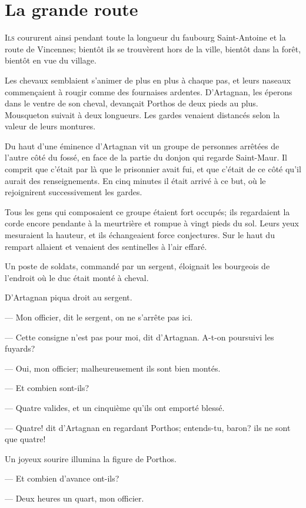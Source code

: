 \chapter{La grande route}

\lettrine{I}{ls} coururent ainsi pendant toute la longueur du faubourg Saint-Antoine et la route de Vincennes; bientôt ils se trouvèrent hors de la ville, bientôt dans la forêt, bientôt en vue du village.

\zz
Les chevaux semblaient s'animer de plus en plus à chaque pas, et leurs naseaux commençaient à rougir comme des fournaises ardentes. D'Artagnan, les éperons dans le ventre de son cheval, devançait Porthos de deux pieds au plus. Mousqueton suivait à deux longueurs. Les gardes venaient distancés selon la valeur de leurs montures.

Du haut d'une éminence d'Artagnan vit un groupe de personnes arrêtées de l'autre côté du fossé, en face de la partie du donjon qui regarde Saint-Maur. Il comprit que c'était par là que le prisonnier avait fui, et que c'était de ce côté qu'il aurait des renseignements. En cinq minutes il était arrivé à ce but, où le rejoignirent successivement les gardes.

Tous les gens qui composaient ce groupe étaient fort occupés; ils regardaient la corde encore pendante à la meurtrière et rompue à vingt pieds du sol. Leurs yeux mesuraient la hauteur, et ils échangeaient force conjectures. Sur le haut du rempart allaient et venaient des sentinelles à l'air effaré.

Un poste de soldats, commandé par un sergent, éloignait les bourgeois de l'endroit où le duc était monté à cheval.

D'Artagnan piqua droit au sergent.

— Mon officier, dit le sergent, on ne s'arrête pas ici.

— Cette consigne n'est pas pour moi, dit d'Artagnan. A-t-on poursuivi les fuyards?

— Oui, mon officier; malheureusement ils sont bien montés.

— Et combien sont-ils?

— Quatre valides, et un cinquième qu'ils ont emporté blessé.

— Quatre! dit d'Artagnan en regardant Porthos; entends-tu, baron? ils ne sont que quatre!

Un joyeux sourire illumina la figure de Porthos.

— Et combien d'avance ont-ils?

— Deux heures un quart, mon officier.


